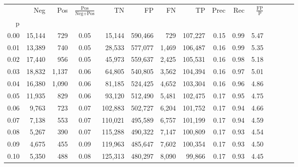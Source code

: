 \begin{tabular}{rrrcrrrrrrrrrrr}
\toprule
{} &     Neg &    Pos & $\frac{\text{Pos}}{\text{Neg}+\text{Pos}}$ &       TN &       FP &       FN &       TP &  Prec &   Rec & $\frac{\text{FP}}{\text{P}}$ \\
p    &         &        &                                            &          &          &          &          &       &       &                              \\
\midrule
0.00 &  15,144 &    729 &                                       0.05 &   15,144 &  590,466 &      729 &  107,227 &  0.15 &  0.99 &                         5.47 \\
0.01 &  13,389 &    740 &                                       0.05 &   28,533 &  577,077 &    1,469 &  106,487 &  0.16 &  0.99 &                         5.35 \\
0.02 &  17,440 &    956 &                                       0.05 &   45,973 &  559,637 &    2,425 &  105,531 &  0.16 &  0.98 &                         5.18 \\
0.03 &  18,832 &  1,137 &                                       0.06 &   64,805 &  540,805 &    3,562 &  104,394 &  0.16 &  0.97 &                         5.01 \\
0.04 &  16,380 &  1,090 &                                       0.06 &   81,185 &  524,425 &    4,652 &  103,304 &  0.16 &  0.96 &                         4.86 \\
0.05 &  11,935 &    829 &                                       0.06 &   93,120 &  512,490 &    5,481 &  102,475 &  0.17 &  0.95 &                         4.75 \\
0.06 &   9,763 &    723 &                                       0.07 &  102,883 &  502,727 &    6,204 &  101,752 &  0.17 &  0.94 &                         4.66 \\
0.07 &   7,138 &    553 &                                       0.07 &  110,021 &  495,589 &    6,757 &  101,199 &  0.17 &  0.94 &                         4.59 \\
0.08 &   5,267 &    390 &                                       0.07 &  115,288 &  490,322 &    7,147 &  100,809 &  0.17 &  0.93 &                         4.54 \\
0.09 &   4,675 &    455 &                                       0.09 &  119,963 &  485,647 &    7,602 &  100,354 &  0.17 &  0.93 &                         4.50 \\
0.10 &   5,350 &    488 &                                       0.08 &  125,313 &  480,297 &    8,090 &   99,866 &  0.17 &  0.93 &                         4.45 \\

\end{tabular}
